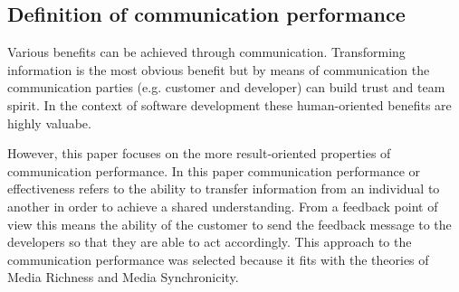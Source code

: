 \documentclass[conference]{IEEEtran}
\begin{document}
\subsection{Definition of communication performance}

Various benefits can be achieved through communication. Transforming information is the most obvious benefit but by means of communication the communication parties (e.g. customer and developer) can build trust and team spirit. In the context of software development these human-oriented benefits are highly valuabe.

However, this paper focuses on the more result-oriented properties of communication performance. In this paper communication performance or effectiveness refers to the ability to transfer information from an individual to another in order to achieve a shared understanding. From a feedback point of view this means the ability of the customer to send the feedback message to the developers so that they are able to act accordingly. This approach to the communication performance was selected because it fits with the theories of Media Richness and Media Synchronicity.
\end{document}
